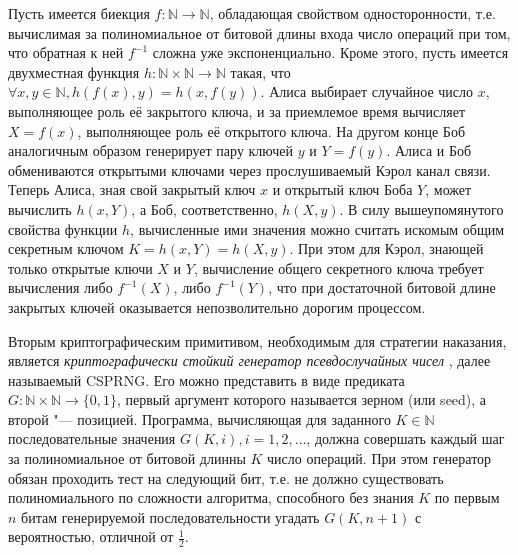 Пусть имеется биекция $f: \mathbb{N} \rightarrow \mathbb{N}$, обладающая свойством односторонности, т.е. вычислимая за полиномиальное от битовой длины входа число операций при том, что обратная к ней $f^{-1}$ сложна уже экспоненциально. Кроме этого, пусть имеется двухместная функция $h : \mathbb{N} \times \mathbb{N} \rightarrow \mathbb{N}$ такая, что $\forall x, y \in \mathbb{N}, h(f(x), y) = h(x, f(y))$. Алиса выбирает случайное число $x$, выполняющее роль её закрытого ключа, и за приемлемое время вычисляет $X = f(x)$, выполняющее роль её открытого ключа. На другом конце Боб аналогичным образом генерирует пару ключей $y$ и $Y = f(y)$. Алиса и Боб обмениваются открытыми ключами через прослушиваемый Кэрол канал связи. Теперь Алиса, зная свой закрытый ключ $x$ и открытый ключ Боба $Y$, может вычислить $h(x, Y)$, а Боб, соответственно, $h(X, y)$. В силу вышеупомянутого свойства функции $h$, вычисленные ими значения можно считать искомым общим секретным ключом $K = h(x, Y) = h(X, y)$. При этом для Кэрол, знающей только открытые ключи $X$ и $Y$, вычисление общего секретного ключа требует вычисления либо $f^{-1}(X)$, либо $f^{-1}(Y)$, что при достаточной битовой длине закрытых ключей оказывается непозволительно дорогим процессом.

Вторым криптографическим примитивом, необходимым для стратегии наказания, является \emph{криптографически стойкий генератор псевдослучайных чисел} \cite{Gutmann}, далее называемый CSPRNG. Его можно представить в виде предиката $G : \mathbb{N} \times \mathbb{N} \rightarrow \{0, 1\}$, первый аргумент которого называется зерном (или seed), а второй "--- позицией. Программа, вычисляющая для заданного $K \in \mathbb{N}$ последовательные значения $G(K, i), i = 1, 2, \ldots$, должна совершать каждый шаг за полиномиальное от битовой длинны $K$ число операций. При этом генератор обязан проходить тест на следующий бит, т.е. не должно существовать полиномиального по сложности алгоритма, способного без знания $K$ по первым $n$ битам генерируемой последовательности угадать $G(K, n+1)$ с вероятностью, отличной от $\frac{1}{2}$.

